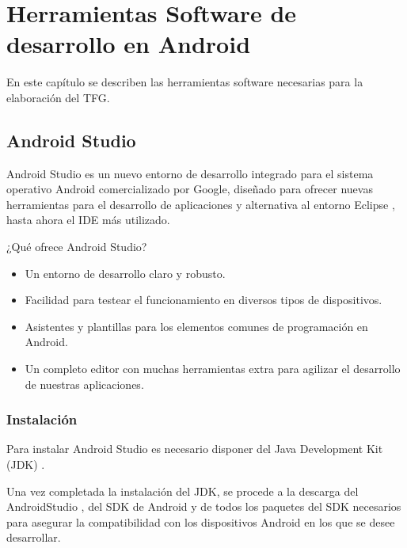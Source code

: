 %
%
%
%

\cleardoublepage
\chapter{Herramientas Software de desarrollo en Android} \label{chap:polytopes}  

En este capítulo se describen las herramientas software necesarias para la 
elaboración del TFG.

\section{Android Studio}

Android Studio \cite{URL::AndroidStudio} es un nuevo entorno de desarrollo 
integrado para el sistema operativo Android comercializado por Google, 
diseñado para ofrecer nuevas herramientas para el desarrollo de aplicaciones y 
alternativa al entorno Eclipse \cite{URL::Eclipse}, 
hasta ahora el IDE más utilizado.

¿Qué ofrece Android Studio? 
\begin{itemize}
\item Un entorno de desarrollo claro y robusto.
\item Facilidad para testear el funcionamiento en diversos tipos de dispositivos.
\item Asistentes y plantillas para los elementos comunes de programación en 
Android.
\item Un completo editor con muchas herramientas extra para agilizar el desarrollo 
de nuestras aplicaciones.
\end{itemize}

\subsection{Instalación}
Para instalar Android Studio es necesario disponer del Java Development Kit 
(JDK) \cite{URL::JDKInfo}. 

Una vez completada la instalación del JDK, se procede a la descarga del 
AndroidStudio \cite{URL::AndroidStudio}, del SDK de Android
\cite{URL::InstallSDK} y de todos los paquetes del SDK \cite{URL::SDKPackages} 
necesarios para asegurar la compatibilidad con los dispositivos Android en
los que se desee desarrollar.

